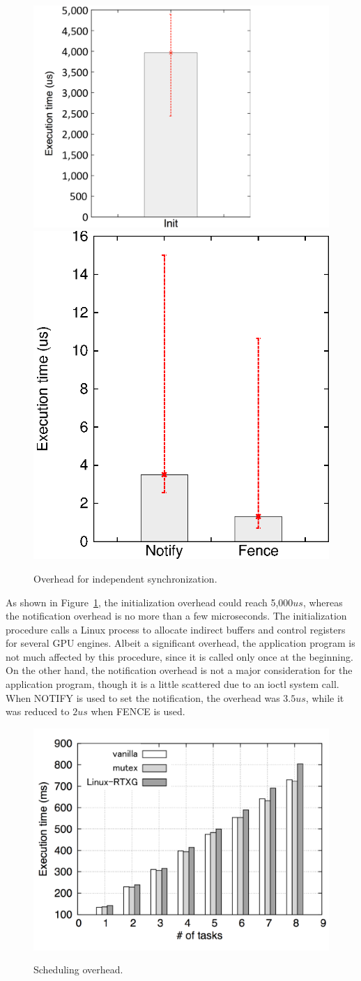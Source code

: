 \begin{figure}[!t]
\begin{center}
{\includegraphics[height=0.24\textwidth]{img/temp.pdf}}
{\includegraphics[height=0.24\textwidth]{img/irq_rise_notify.eps}}
\vspace{-2mm}
\caption{Overhead for independent synchronization.}
\vspace{-6mm}
\label{fig:irq_rise_overhead}
\end{center}
\end{figure}

As shown in Figure~\ref{fig:irq_rise_overhead}, the initialization overhead could reach 5,000$us$, whereas the notification overhead is no more than a few microseconds.
The initialization procedure calls a Linux process to allocate indirect buffers and control registers for several GPU engines.
Albeit a significant overhead, the application program is not much affected by this procedure, since it is called only once at the beginning.
On the other hand, the notification overhead is not a major consideration for the application program, though it is a little scattered due to an ioctl system call.
When NOTIFY is used to set the notification, the overhead was $3.5us$, while it was reduced to $2us$ when FENCE is used.

\label{sec:eval:sched_overhead}

\begin{figure}[!t]
\begin{center}
\includegraphics[width=.44\textwidth]{img/temp2.pdf}
\vspace{-4mm}
\caption{Scheduling overhead.}
\vspace{-8mm}
\label{fig:fp_task_overhead}
\end{center}
\end{figure}

